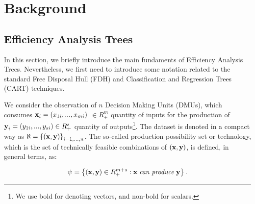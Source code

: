 \hypertarget{section2}{%
\section{Background}\label{section2}}

\hypertarget{section2.1}{%
\subsection{Efficiency Analysis Trees}\label{section2.1}}

In this section, we briefly introduce the main fundaments of Efficiency
Analysis Trees. Nevertheless, we first need to introduce some notation
related to the standard Free Disposal Hull (FDH) and Classification and
Regression Trees (CART) techniques.

We consider the observation of \(n\) Decision Making Units (DMUs), which
consumes \({\it \textbf{x}}_{i} =(x_{1i} ,...,x_{mi})\)
\(\in R_{+}^{m}\) quantity of inputs for the production of
\({\it \textbf{y}}_{i} =(y_{1i} ,...,y_{si} )\in R_{+}^{s}\) quantity of
outputs\footnote{We use bold for denoting vectors, and non-bold for scalars.}.
The dataset is denoted in a compact way as
\(\aleph =\left\{\left({\it \textbf{x},\textbf{y}}\right)\right\}_{i=1,...,n}^{}\).
The so-called production possibility set or technology, which is the set
of technically feasible combinations of
\(({\it \textbf{x},\textbf{y}})\), is defined, in general terms, as:

\begin{equation} \label{(1)} 
\psi =\left\{({\it \textbf{x},\textbf{y}})\in R_{+}^{m+s} :{\it \textbf{x}\; }{\it can\; produce\; \textbf{y}}\right\}.
\end{equation}

